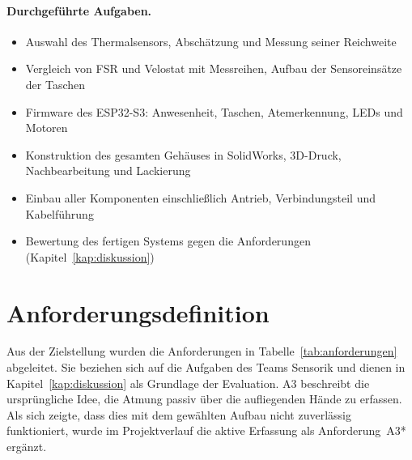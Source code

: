 \paragraph{Durchgeführte Aufgaben.}
\begin{itemize}
  \item Auswahl des Thermalsensors, Abschätzung und Messung seiner Reichweite
  \item Vergleich von \ac{FSR} und Velostat mit Messreihen, Aufbau der Sensoreinsätze der Taschen
  \item Firmware des ESP32-S3: Anwesenheit, Taschen, Atemerkennung, \acp{LED} und Motoren
  \item Konstruktion des gesamten Gehäuses in SolidWorks, 3D-Druck, Nachbearbeitung und Lackierung
  \item Einbau aller Komponenten einschließlich Antrieb, Verbindungsteil und Kabelführung
  \item Bewertung des fertigen Systems gegen die Anforderungen (Kapitel~\ref{kap:diskussion})
\end{itemize}

\section{Anforderungsdefinition}
\label{sec:anforderungen}

Aus der Zielstellung wurden die Anforderungen in Tabelle~\ref{tab:anforderungen}
abgeleitet. Sie beziehen sich auf die Aufgaben des Teams Sensorik und dienen in
Kapitel~\ref{kap:diskussion} als Grundlage der Evaluation. A3 beschreibt die ursprüngliche
Idee, die Atmung passiv über die aufliegenden Hände zu erfassen. Als sich zeigte, dass dies
mit dem gewählten Aufbau nicht zuverlässig funktioniert, wurde im Projektverlauf die aktive
Erfassung als Anforderung~A3* ergänzt.

